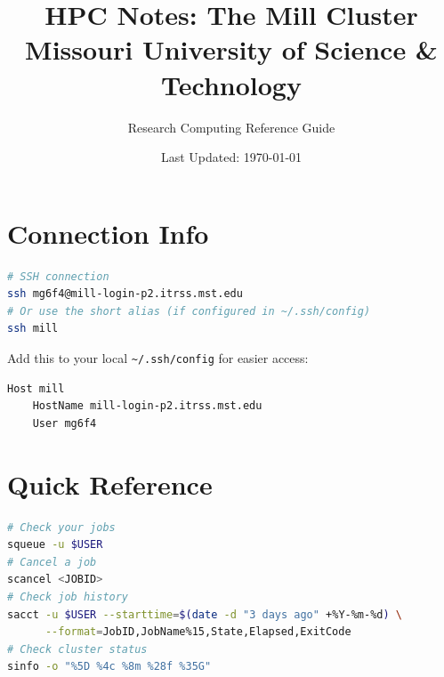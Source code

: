 \documentclass[11pt,a4paper]{article}
\title{\textbf{HPC Notes: The Mill Cluster}\\[0.5em]\large Missouri University of Science \& Technology}
\author{Research Computing Reference Guide}
\date{Last Updated: \today}
\begin{document}
\maketitle
\tableofcontents
\newpage
\section{Connection Info}
\begin{lstlisting}[language=bash]
# SSH connection
ssh mg6f4@mill-login-p2.itrss.mst.edu
# Or use the short alias (if configured in ~/.ssh/config)
ssh mill
\end{lstlisting}
\begin{tipbox}
Add this to your local \texttt{\textasciitilde/.ssh/config} for easier access:
\begin{lstlisting}[language=bash]
Host mill
    HostName mill-login-p2.itrss.mst.edu
    User mg6f4
\end{lstlisting}
\end{tipbox}
\section{Quick Reference}
\begin{lstlisting}[language=bash]
# Check your jobs
squeue -u $USER
# Cancel a job
scancel <JOBID>
# Check job history
sacct -u $USER --starttime=$(date -d "3 days ago" +%Y-%m-%d) \
      --format=JobID,JobName%15,State,Elapsed,ExitCode
# Check cluster status
sinfo -o "%5D %4c %8m %28f %35G"
\end{lstlisting}
\end{document}
